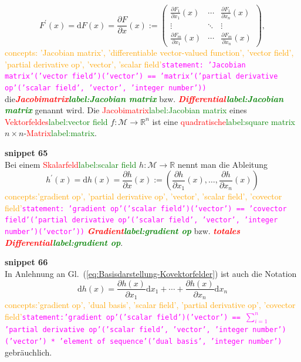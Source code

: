 \documentclass[a4paper,twoside,english,ngerman,deutsch,german,sectrefs,envcountsame,envcountchap]{svmono}
\newcommand{\setref}[2]{\textcolor{red}{#1}\textcolor{green}{#2}}
\newcommand{\snippet}[1]{\textbf{snippet #1}\\}
\newcommand{\eqnote}[2]{\textcolor{orange}{#1}\textcolor{magenta}{\texttt{#2}}}
\begin{document}
\begin{equation}
F^{\prime}(x)={\mathrm{d}} F(x)=\frac{\partial F}{\partial x}(x):=\left(\begin{array}{ccc}
\frac{\partial F_{1}}{\partial x_{1}}(x) & \cdots & \frac{\partial F_{1}}{\partial x_{n}}(x)\\
\vdots & \ddots & \vdots\\
\frac{\partial F_{m}}{\partial x_{1}}(x) & \cdots & \frac{\partial F_{m}}{\partial x_{n}}(x)
\end{array}\right),\label{eq:dF}
\end{equation}\eqnote{concepts: 'Jacobian matrix', 'differentiable vector-valued function', 'vector field', 'partial derivative op', 'vector', 'scalar field'}{statement: 'Jacobian matrix'('vector field')('vector') == 'matrix'('partial derivative op'('scalar field', 'vector', 'integer number'))}
die\textbf{\em \setref{Jacobimatrix}{label:Jacobian matrix}} bzw. \textbf{\em \setref{Differential}{label:Jacobian matrix}}
genannt wird. Die \setref{Jacobimatrix}{label:Jacobian matrix} eines \setref{Vektorfeldes}{label:vector field} $f:\mathcal{M}\to{\mathbb{R}}^{n}$
ist eine \setref{quadratische}{label:square matrix} $n\times n$-\setref{Matrix}{label:matrix}.

\snippet{65}
Bei einem \setref{Skalarfeld}{label:scalar field} $h:\mathcal{M}\to{\mathbb{R}}$
nennt man die Ableitung
\begin{equation}
h^{\prime}(x)={\mathrm{d}} h(x)=\frac{\partial h}{\partial x}(x):=\left(\frac{\partial h}{\partial x_{1}}(x),\ldots,\frac{\partial h}{\partial x_{n}}(x)\right)\label{eq:dh}
\end{equation}\eqnote{concepts:'gradient op', 'partial derivative op', 'vector', 'scalar field', 'covector field'}{statement: 'gradient op'('scalar field')('vector') == 'covector field'('partial derivative op'('scalar field', 'vector', 'integer number')('vector'))}
\textbf{\em \setref{Gradient}{label:gradient op}} bzw. \textbf{\em \setref{totales Differential}{label:gradient op}}.

\snippet{66}
In Anlehnung an Gl.~(\ref{eq:Basisdarstellung-Kovektorfelder}) ist
auch die Notation
\[
{\mathrm{d}} h(x)=\frac{\partial h(x)}{\partial x_{1}}{\mathrm{d}} x_{1}+\cdots+\frac{\partial h(x)}{\partial x_{n}}{\mathrm{d}} x_{n}
\]\eqnote{concepts:'gradient op', 'dual basis', 'scalar field', 'partial derivative op', 'covector field'}{statement:'gradient op'('scalar field')('vector') == $\sum_{i=1}^n$ 'partial derivative op'('scalar field', 'vector', 'integer number')('vector') * 'element of sequence'('dual basis', 'integer number')}
gebräuchlich.
\end{document}
